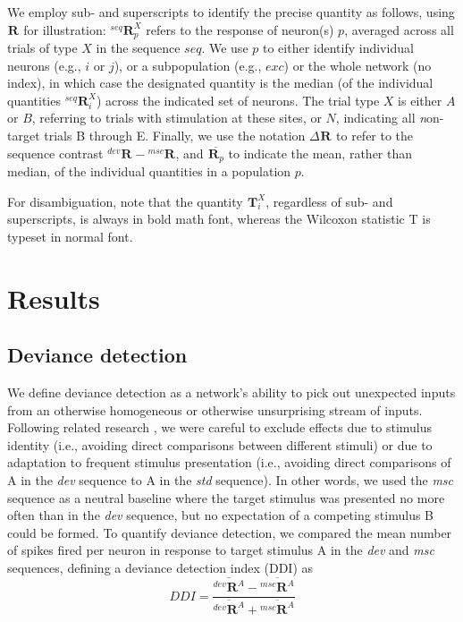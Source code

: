 \documentclass[pdflatex,referee,iicol,sn-basic]{sn-jnl}
\newcommand{\dev}{\textit{dev}}
\newcommand{\msc}{\textit{msc}}
\newcommand{\std}{\textit{std}}
\renewcommand{\R}[3][]{{}^{#1}_{}\!\mathbf{R}^{#2}_{#3}}
\renewcommand{\T}[3][]{{}^{#1}_{}\mathbf{T}^{#2}_{#3}}
\newcommand{\mean}[1]{\overline{#1}}
\theoremstyle{thmstyleone}%
\theoremstyle{thmstyletwo}%
\theoremstyle{thmstylethree}%
\begin{document}
We employ sub- and superscripts to identify the precise quantity as follows, using $\R{}{}$ for illustration: $\R[seq]{X}{p}$ refers to the response of neuron(s) $p$, averaged across all trials of type $X$ in the sequence $seq$. We use $p$ to either identify individual neurons (e.g., $i$ or $j$), or a subpopulation (e.g., $exc$) or the whole network (no index), in which case the designated quantity is the median (of the individual quantities $\R[seq]{X}{i}$) across the indicated set of neurons. The trial type $X$ is either $A$ or $B$, referring to trials with stimulation at these sites, or $N$, indicating all \textit{n}on-target trials B through E. Finally, we use the notation $\Delta \R{}{}$ to refer to the sequence contrast $\R[dev]{}{} - \R[msc]{}{}$, and $\mean{\R{}{p}}$ to indicate the mean, rather than median, of the individual quantities in a population $p$.

For disambiguation, note that the quantity $\T{X}{i}$, regardless of sub- and superscripts, is always in bold math font, whereas the Wilcoxon statistic T is typeset in normal font.

\section{Results}\label{sec-results}

\subsection{Deviance detection}\label{sec-dd}

We define deviance detection as a network's ability to pick out unexpected inputs from an otherwise homogeneous or otherwise unsurprising stream of inputs. Following related research \citep{Kubota2021-dx,Harms2014-ah,Jacobsen2001-sc}, we were careful to exclude effects due to stimulus identity (i.e., avoiding direct comparisons between different stimuli) or due to adaptation to frequent stimulus presentation (i.e., avoiding direct comparisons of A in the \dev{} sequence to A in the \std{} sequence). In other words, we used the \msc{} sequence as a neutral baseline where the target stimulus was presented no more often than in the \dev{} sequence, but no expectation of a competing stimulus B could be formed. To quantify deviance detection, we compared the mean number of spikes fired per neuron in response to target stimulus A in the \dev{} and \msc{} sequences, defining a deviance detection index (DDI) as
\begin{equation}
    DDI = \frac{\mean{\R[dev]{A}{}} - \mean{\R[msc]{A}{}}}{\mean{\R[dev]{A}{}} + \mean{\R[msc]{A}{}}} \label{eqn-ddi}
\end{equation}
\end{document}
